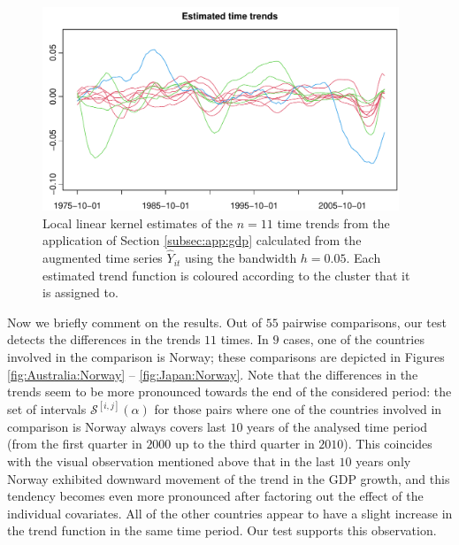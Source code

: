 \documentclass[a4paper,12pt]{article}
\begin{document}
\begin{figure}[t!]
\begin{center}
\includegraphics[width=0.95\textwidth]{output/plots/gdp/gdp_all_clusters}
\caption{Local linear kernel estimates of the $n=11$ time trends from the application of Section \ref{subsec:app:gdp} calculated from the augmented time series $\widehat{Y}_{it}$ using the bandwidth $h = 0.05$. Each estimated trend function is coloured according to the cluster that it is assigned to.}\label{fig:gdp:all_clusters}
\end{center}
\end{figure}

Now we briefly comment on the results. Out of $55$ pairwise comparisons, our test detects the differences in the trends $11$ times. In $9$ cases, one of the countries involved in the comparison is Norway; these comparisons are depicted in Figures \ref{fig:Australia:Norway} -- \ref{fig:Japan:Norway}. Note that the differences in the trends seem to be more pronounced towards the end of the considered period: the set of intervals $\mathcal{S}^{[i, j]}(\alpha)$ for those pairs where one of the countries involved in comparison is Norway always covers last $10$ years of the analysed time period (from the first quarter in $2000$ up to the third quarter in $2010$). This coincides with the visual observation mentioned above that in the last $10$ years only Norway exhibited downward movement of the trend in the GDP growth, and this tendency becomes even more pronounced after factoring out the effect of the individual covariates. All of the other countries appear to have a slight increase in the trend function in the same time period. Our test supports this observation.
\end{document}
